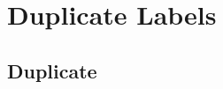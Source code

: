 \documentclass{article}
\begin{document}
\section{Duplicate Labels}\label{sec:dup}
\subsection{Duplicate}\label{sec:dup}
\end{document}
